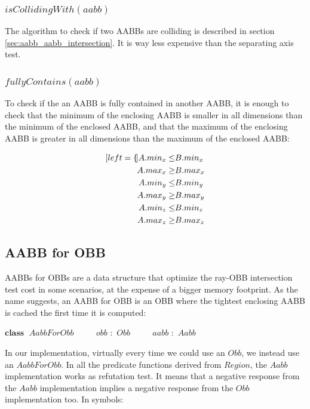 \documentclass{PoliMi_MasterThesis}
\newcommand*\Class[1]{\State $\textbf{class} \;$ #1}
\newcommand*\Member[2]{\State $\qquad$ #1 $:$ #2}
\begin{document}
\subsubsection*{$isCollidingWith(aabb)$}
The algorithm to check if two AABBs are colliding is described in section \ref{sec:aabb_aabb_intersection}. It is way less expensive than the separating axis test.

\subsubsection*{$fullyContains(aabb)$}
To check if the an AABB is fully contained in another AABB, it is enough to check that the minimum of the enclosing AABB is smaller in all dimensions than the minimum of the enclosed AABB, and that the maximum of the enclosing AABB is greater in all dimensions than the maximum of the enclosed AABB:

\begin{subequations}
	\begin{align*}[left=\empheqlbrace]
		A.min_x \leq& B.min_x \\
		A.max_x \geq& B.max_x \\
		A.min_y \leq& B.min_y \\
		A.max_y \geq& B.max_y \\
		A.min_z \leq& B.min_z \\
		A.max_z \geq& B.max_z
	\end{align*}
\end{subequations}

\subsection{AABB for OBB} \label{ssec:aabb_for_obb}
AABBs for OBBs are a data structure that optimize the ray-OBB intersection test cost in some scenarios, at the expense of a bigger memory footprint. As the name suggests, an AABB for OBB is an OBB where the tightest enclosing AABB is cached the first time it is computed:
\begin{algorithm}[H]
	\begin{algorithmic}
		\Class{$AabbForObb$}
		\Member{$obb$}{$Obb$}
		\Member{$aabb$}{$Aabb$}
	\end{algorithmic}
\end{algorithm} 

In our implementation, virtually every time we could use an $Obb$, we instead use an $AabbForObb$. In all the predicate functions derived from $Region$, the $Aabb$ implementation works as refutation test. It means that a negative response from the $Aabb$ implementation implies a negative response from the $Obb$ implementation too. In symbols:
\end{document}
